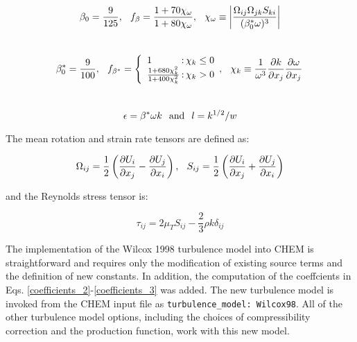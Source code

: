 \begin{equation}
\beta_0 = \frac{9}{125}, \hspace{0.1in}
f_{\beta} = \frac{1 + 70 \chi_{\omega}}{1 + 80 \chi_{\omega}}, \hspace{0.1in}
\chi_{\omega} \equiv \left|{\frac{\Omega_{ij} \Omega_{jk} S_{ki}}{(\beta_{0}^* \omega)^3}} \right|
\label{coefficients_2}
\end{equation}\\

\begin{equation}
\beta_{0}^* = \frac{9}{100}, \hspace{0.1in}
f_{\beta^*} = \left\{ \begin{array} {l@{\,:\,}r}
1
& \chi_k \leq 0 \\
\frac{1 + 680 \chi_{k}^2}{1 + 400 \chi_{k}^2}
& \chi_k > 0 \\
\end{array}, \hspace{0.1in}
\chi_{k} \equiv \frac{1}{\omega^3} \frac{\partial{k}} {\partial{x_j}} \frac{\partial{\omega}} {\partial{x_j}} \right .
\label{coefficients_3}
\end{equation} \\

\begin{equation}
\epsilon = \beta^* \omega k  \hspace{0.1in} \text{and} \hspace{0.1in}
l = k^{1/2}/w
\label{coefficients_4}
\end{equation}

The mean rotation and strain rate tensors are defined as:

\begin{equation}
\Omega_{ij} = \frac{1}{2} \left( \frac{\partial{U_i}} {\partial{x_j}} - \frac{\partial{U_j}} {\partial{x_i}} \right), \hspace{0.1in}
S_{ij} = \frac{1}{2} \left( \frac{\partial{U_i}} {\partial{x_j}} + \frac{\partial{U_j}} {\partial{x_i}} \right)
\end{equation}

\noindent
and the Reynolds stress tensor is:

\begin{equation}
\tau_{ij} = 2 \mu_T S_{ij} - \frac{2}{3} \rho k \delta_{ij}
\end{equation}


The implementation of the Wilcox 1998 turbulence model into CHEM is
straightforward and requires only the modification of existing source
terms and the definition of new constants.  In addition, the
computation of the coeffcients in Eqs.
\ref{coefficients_2}-\ref{coefficients_3} was added.  The new
turbulence model is invoked from the CHEM input file as
\verb!turbulence_model: Wilcox98!.  All of the other turbulence model
options, including the choices of compressibility correction and the
production function, work with this new model.



